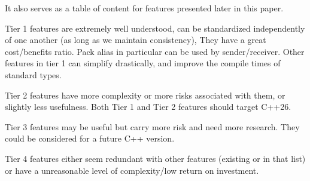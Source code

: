 \documentclass{wg21}
\begin{document}
It also serves as a table of content for features presented later in this paper.

Tier 1 features are extremely well understood, can be standardized independently of one another (as long as we maintain consistency),
They have a great cost/benefits ratio.
Pack alias in particular can be used by sender/receiver.
Other features in tier 1 can simplify drastically, and improve the compile times of standard types.

Tier 2 features have more complexity or more risks associated with them, or slightly less usefulness.
Both Tier 1 and Tier 2 features should target C++26.

Tier 3 features may be useful but carry more risk and need more research. They could be considered for a future C++ version.

Tier 4 features either seem redundant with other features (existing or in that list) or have a unreasonable level of complexity/low return on investment.
\end{document}
